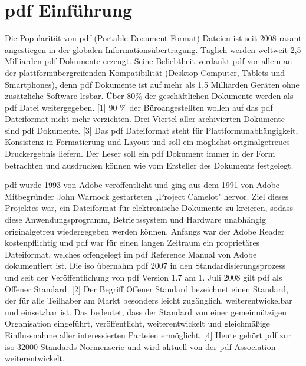 \section{\gls{pdf} Einführung}
Die Popularität von \gls{pdf} (Portable Document Format) Dateien ist seit 2008 rasant angestiegen in der globalen Informationsübertragung. Täglich werden weltweit 2,5 Milliarden \gls{pdf}-Dokumente erzeugt. Seine Beliebtheit verdankt \gls{pdf} vor allem an der plattformübergreifenden Kompatibilität (Desktop-Computer, Tablets und Smartphones), denn \gls{pdf} Dokumente ist auf mehr als 1,5 Milliarden Geräten ohne zusätzliche Software lesbar. Über 80\% der geschäftlichen Dokumente werden als \gls{pdf} Datei weitergegeben. [1] 90 \% der Büroangestellten wollen auf das \gls{pdf} Dateiformat nicht mehr verzichten. Drei Viertel aller archivierten Dokumente sind \gls{pdf} Dokumente. [3] Das \gls{pdf} Dateiformat steht für Plattformunabhängigkeit, Konsistenz in Formatierung und Layout und soll ein möglichst originalgetreues Druckergebnis liefern. Der Leser soll ein \gls{pdf} Dokument immer in der Form betrachten und ausdrucken können wie vom Ersteller des Dokuments festgelegt.
\par
\gls{pdf} wurde 1993 von Adobe veröffentlicht und ging aus dem 1991 von Adobe-Mitbegründer John Warnock gestarteten „Project Camelot" hervor. Ziel dieses Projektes war, ein Dateiformat für elektronische Dokumente zu kreieren, sodass diese Anwendungsprogramm, Betriebssystem und Hardware unabhängig originalgetreu wiedergegeben werden können. Anfangs war der Adobe Reader kostenpflichtig und \gls{pdf} war für einen langen Zeitraum ein proprietäres Dateiformat, welches offengelegt im \gls{pdf} Reference Manual von Adobe dokumentiert ist. Die \gls{iso} übernahm \gls{pdf} 2007 in den Standardisierungsprozess und seit der Veröffentlichung von \gls{pdf} Version 1.7 am 1. Juli 2008 gilt \gls{pdf} als Offener Standard. [2] Der Begriff Offener Standard bezeichnet einen Standard, der für alle Teilhaber am Markt besonders leicht zugänglich, weiterentwickelbar und einsetzbar ist. Das bedeutet, dass der Standard von einer gemeinnützigen Organisation eingeführt, veröffentlicht, weiterentwickelt und gleichmäßige Einflussnahme aller interessierten Parteien ermöglicht. [4] Heute gehört \gls{pdf} zur \gls{iso} 32000-Standards Normenserie und wird aktuell von der \gls{pdf} Association weiterentwickelt.
